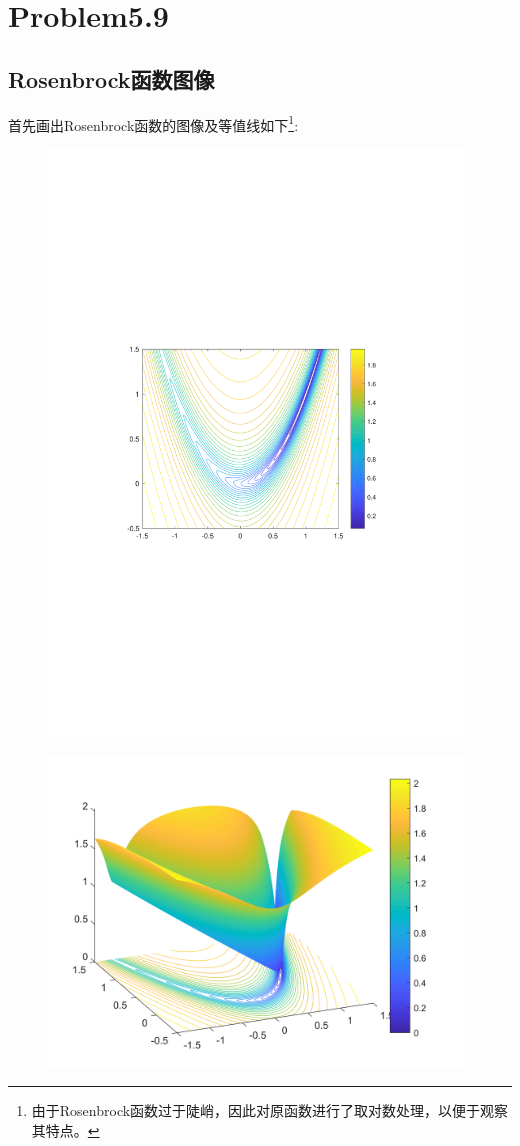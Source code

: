 \newpage
\section{Problem5.9}
\subsection{Rosenbrock函数图像}
首先画出Rosenbrock函数的图像及等值线如下\footnote{由于Rosenbrock函数过于陡峭，因此对原函数进行了取对数处理，以便于观察其特点。}:


\begin{figure}[H]
\centering
\includegraphics[width=11cm]{fig/4_01.pdf}
\end{figure}


\begin{figure}[H]
\centering
\includegraphics[width=11cm]{fig/4_02.png}
\end{figure}

